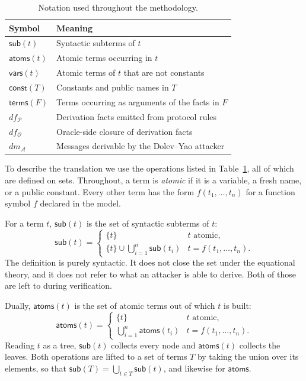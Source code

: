 \begin{table}[t]
    \centering
    \caption{Notation used throughout the methodology.}
    \label{tab:notation}
    \renewcommand{\arraystretch}{1.15}
    \small
    \begin{tabular}{@{}ll@{}}
    \toprule
    Symbol & Meaning \\
    \midrule
    $\mathsf{sub}(t)$           & Syntactic subterms of $t$ \\
    $\mathsf{atoms}(t)$         & Atomic terms occurring in $t$ \\
    $\mathsf{vars}(t)$          & Atomic terms of $t$ that are not constants \\
    $\mathsf{const}(T)$         & Constants and public names in $T$ \\
    $\mathsf{terms}(F)$         & Terms occurring as arguments of the facts in $F$ \\
    $df_\mathcal{P}$            & Derivation facts emitted from protocol rules \\
    $df_\mathcal{O}$            & Oracle-side closure of derivation facts \\
    $dm_\mathcal{A}$            & Messages derivable by the Dolev--Yao attacker \\
    \bottomrule
    \end{tabular}
\end{table}

To describe the translation we use the operations listed in Table~\ref{tab:notation}, all of which
are defined on sets.
Throughout, a term is \emph{atomic} if it is a variable, a fresh name, or a public constant. Every
other term has the form $f(t_1,\ldots,t_n)$ for a function symbol $f$ declared in the model.

For a term $t$, $\mathsf{sub}(t)$ is the set of syntactic subterms of $t$:
\[
    \mathsf{sub}(t) =
    \begin{cases}
        \{t\} & \text{$t$ atomic,} \\[2pt]
        \{t\} \cup \bigcup_{i=1}^{n} \mathsf{sub}(t_i) & \text{$t = f(t_1,\ldots,t_n)$.}
    \end{cases}
\]
The definition is purely syntactic. It does not close the set under the equational theory, and it
does not refer to what an attacker is able to derive. Both of those are left to \Tamarin{} during
verification.

Dually, $\mathsf{atoms}(t)$ is the set of atomic terms out of which $t$ is built:
\[
    \mathsf{atoms}(t) =
    \begin{cases}
        \{t\} & \text{$t$ atomic,} \\[2pt]
        \bigcup_{i=1}^{n} \mathsf{atoms}(t_i) & \text{$t = f(t_1,\ldots,t_n)$.}
    \end{cases}
\]
Reading $t$ as a tree, $\mathsf{sub}(t)$ collects every node and $\mathsf{atoms}(t)$ collects the
leaves. Both operations are lifted to a set of terms $T$ by taking the union over its elements, so
that $\mathsf{sub}(T) = \bigcup_{t \in T} \mathsf{sub}(t)$, and likewise for $\mathsf{atoms}$.

